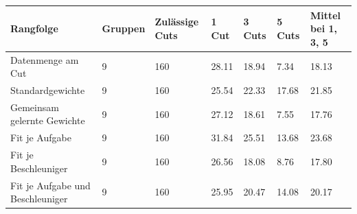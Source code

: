 \begin{tabular}{@{}lllllll@{}}
\toprule
Rangfolge & Gruppen & Zulässige Cuts & 1 Cut & 3 Cuts & 5 Cuts & Mittel bei 1, 3, 5 \\
\midrule
Datenmenge am Cut & 9 & 160 & 28.11 & 18.94 & 7.34 & 18.13 \\
Standardgewichte & 9 & 160 & 25.54 & 22.33 & 17.68 & 21.85 \\
Gemeinsam gelernte Gewichte & 9 & 160 & 27.12 & 18.61 & 7.55 & 17.76 \\
Fit je Aufgabe & 9 & 160 & 31.84 & 25.51 & 13.68 & 23.68 \\
Fit je Beschleuniger & 9 & 160 & 26.56 & 18.08 & 8.76 & 17.80 \\
Fit je Aufgabe und Beschleuniger & 9 & 160 & 25.95 & 20.47 & 14.08 & 20.17 \\
\bottomrule
\end{tabular}
